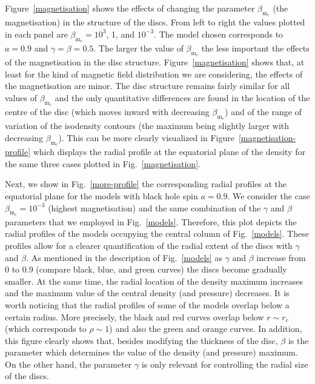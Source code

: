 \documentclass[referee]{aa}
\begin{document}
Figure~\ref{magnetisation} shows the effects of changing the parameter $\beta_{\mathrm{m}_{\mathrm{c}}}$ (the magnetisation) in the structure of the discs. From left to right the values plotted in each panel are $\beta_{\mathrm{m}_{\mathrm{c}}}=10^3$, 1, and $10^{-3}$. The model chosen corresponds to $a=0.9$ and $\gamma=\beta=0.5$. The larger the value of $\beta_{\mathrm{m}_{\mathrm{c}}}$ the less important the effects of the magnetisation in the disc structure. Figure~\ref{magnetisation} shows that, at least for the kind of magnetic field distribution we are considering, the effects of the magnetisation are minor. The disc structure remains fairly similar for all values of $\beta_{\mathrm{m}_{\mathrm{c}}}
$ and the only quantitative differences are found in the location of the centre of the disc (which moves inward with decreasing $\beta_{\mathrm{m}_{\mathrm{c}}}$) and of the range of variation of the isodensity contours (the maximum being slightly larger with decreasing $\beta_{\mathrm{m}_{\mathrm{c}}}$). This can be more clearly visualized in Figure~\ref{magnetisation-profile} which displays the radial profile at the equatorial plane of the density for the same three cases plotted in Fig.~\ref{magnetisation}.

Next, we show in Fig.~\ref{more-profile} the corresponding radial profiles at the equatorial plane for the models with black hole spin $a=0.9$. We consider the case $\beta_{\mathrm{m}_{\mathrm{c}}}=10^{-3}$ (highest magnetisation) and the same combination of the $\gamma$ and $\beta$ parameters that we employed in Fig.~\ref{models}. Therefore, this plot depicts the radial profiles of the models occupying the central column of Fig.~\ref{models}. These profiles allow for a clearer quantification of the radial extent of the discs with $\gamma$ and $\beta$. As mentioned in the description of Fig.~\ref{models} as $\gamma$ and $\beta$ increase from 0 to 0.9 (compare black, blue, and green curves) the discs become gradually smaller. At the same time, the radial location of the density maximum increases and the maximum value of the central density (and pressure) decreases. It is worth noticing that the radial profiles of some of the models overlap below a certain radius. More precisely, the black and red curves overlap below $r\sim r_{\mathrm{c}}$ (which corresponds to $\rho \sim 1$) and also the green and orange curves. In addition, this figure clearly shows that, besides modifying the thickness of the disc, $\beta$ is the parameter which determines the value of the density (and pressure) maximum. On the other hand, the parameter $\gamma$ is only relevant for controlling the radial size of the discs.
\end{document}
